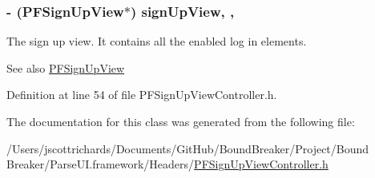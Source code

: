 \hypertarget{interface_p_f_sign_up_view_controller_aabe62b83ad3128c64650b19e995aad27}{}
\subsubsection[{sign\+Up\+View}]{\setlength{\rightskip}{0pt plus 5cm}-\/ ({\bf P\+F\+Sign\+Up\+View}$\ast$) sign\+Up\+View\hspace{0.3cm}{\ttfamily [read]}, {\ttfamily [nonatomic]}, {\ttfamily [strong]}}\label{interface_p_f_sign_up_view_controller_aabe62b83ad3128c64650b19e995aad27}
The sign up view. It contains all the enabled log in elements.

\begin{DoxySeeAlso}{See also}
\hyperlink{interface_p_f_sign_up_view}{P\+F\+Sign\+Up\+View} 
\end{DoxySeeAlso}


Definition at line 54 of file P\+F\+Sign\+Up\+View\+Controller.\+h.



The documentation for this class was generated from the following file\+:\begin{DoxyCompactItemize}
\item 
/\+Users/jscottrichards/\+Documents/\+Git\+Hub/\+Bound\+Breaker/\+Project/\+Bound Breaker/\+Parse\+U\+I.\+framework/\+Headers/\hyperlink{_p_f_sign_up_view_controller_8h}{P\+F\+Sign\+Up\+View\+Controller.\+h}\end{DoxyCompactItemize}
